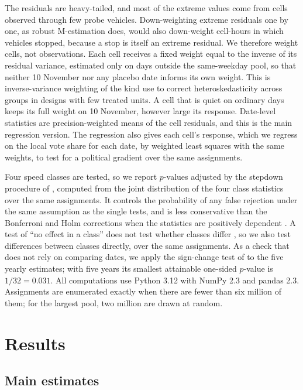 \documentclass[11pt,a4paper]{article}
\begin{document}
The residuals are heavy-tailed, and most of the extreme values come from cells observed through few
probe vehicles. Down-weighting extreme residuals one by one, as robust M-estimation does, would also
down-weight cell-hours in which vehicles stopped, because a stop is itself an extreme residual. We
therefore weight cells, not observations. Each cell receives a fixed weight equal to the inverse of
its residual variance, estimated only on days outside the same-weekday pool, so that neither
10 November nor any placebo date informs its own weight. This is inverse-variance weighting of the
kind \citet{ferman2019} use to correct heteroskedasticity across groups in designs with few treated
units. A cell that is quiet on ordinary days keeps its full weight on 10 November, however large its
response. Date-level statistics are precision-weighted means of the cell residuals, and this is the
main regression version. The regression also gives each cell's response, which we regress on the
local vote share for each date, by weighted least squares with the same weights, to test for a
political gradient over the same assignments.

Four speed classes are tested, so we report $p$-values adjusted by the stepdown procedure of
\citet{romano2005b}, computed from the joint distribution of the four class statistics over the same
assignments. It controls the probability of any false rejection under the same assumption as the
single tests, and is less conservative than the Bonferroni and Holm corrections when the statistics
are positively dependent \citep{romano2005a}. A test of ``no effect in a class'' does not test
whether classes differ \citep{list2019,ding2016}, so we also test differences between classes
directly, over the same assignments. As a check that does not rely on comparing dates, we apply the sign-change test of
\citet{canay2017} to the five yearly estimates; with five years its smallest attainable one-sided
$p$-value is $1/32 = 0.031$. All computations use Python 3.12 with NumPy 2.3 and pandas 2.3.
Assignments are enumerated exactly when there are fewer than six million of them; for the largest
pool, two million are drawn at random.

\section{Results}

\subsection{Main estimates}
\end{document}
